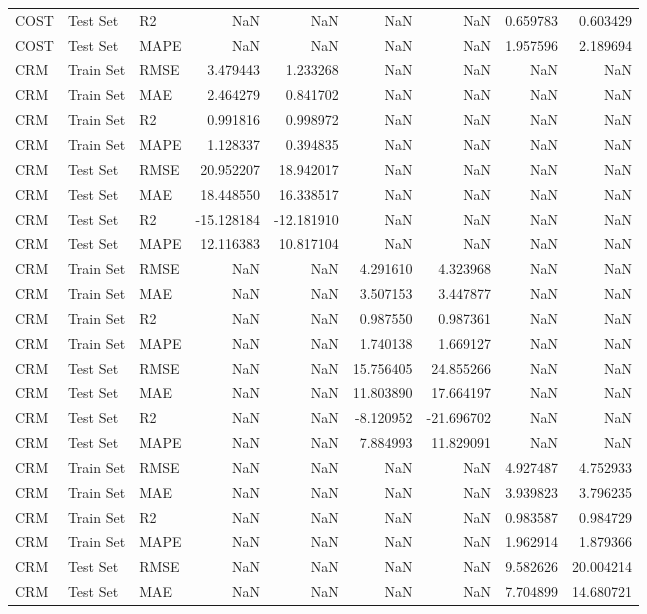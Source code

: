 \begin{tabular}{lllrrrrrr}
COST & Test Set & R2 & NaN & NaN & NaN & NaN & 0.659783 & 0.603429 \\
COST & Test Set & MAPE & NaN & NaN & NaN & NaN & 1.957596 & 2.189694 \\
CRM & Train Set & RMSE & 3.479443 & 1.233268 & NaN & NaN & NaN & NaN \\
CRM & Train Set & MAE & 2.464279 & 0.841702 & NaN & NaN & NaN & NaN \\
CRM & Train Set & R2 & 0.991816 & 0.998972 & NaN & NaN & NaN & NaN \\
CRM & Train Set & MAPE & 1.128337 & 0.394835 & NaN & NaN & NaN & NaN \\
CRM & Test Set & RMSE & 20.952207 & 18.942017 & NaN & NaN & NaN & NaN \\
CRM & Test Set & MAE & 18.448550 & 16.338517 & NaN & NaN & NaN & NaN \\
CRM & Test Set & R2 & -15.128184 & -12.181910 & NaN & NaN & NaN & NaN \\
CRM & Test Set & MAPE & 12.116383 & 10.817104 & NaN & NaN & NaN & NaN \\
CRM & Train Set & RMSE & NaN & NaN & 4.291610 & 4.323968 & NaN & NaN \\
CRM & Train Set & MAE & NaN & NaN & 3.507153 & 3.447877 & NaN & NaN \\
CRM & Train Set & R2 & NaN & NaN & 0.987550 & 0.987361 & NaN & NaN \\
CRM & Train Set & MAPE & NaN & NaN & 1.740138 & 1.669127 & NaN & NaN \\
CRM & Test Set & RMSE & NaN & NaN & 15.756405 & 24.855266 & NaN & NaN \\
CRM & Test Set & MAE & NaN & NaN & 11.803890 & 17.664197 & NaN & NaN \\
CRM & Test Set & R2 & NaN & NaN & -8.120952 & -21.696702 & NaN & NaN \\
CRM & Test Set & MAPE & NaN & NaN & 7.884993 & 11.829091 & NaN & NaN \\
CRM & Train Set & RMSE & NaN & NaN & NaN & NaN & 4.927487 & 4.752933 \\
CRM & Train Set & MAE & NaN & NaN & NaN & NaN & 3.939823 & 3.796235 \\
CRM & Train Set & R2 & NaN & NaN & NaN & NaN & 0.983587 & 0.984729 \\
CRM & Train Set & MAPE & NaN & NaN & NaN & NaN & 1.962914 & 1.879366 \\
CRM & Test Set & RMSE & NaN & NaN & NaN & NaN & 9.582626 & 20.004214 \\
CRM & Test Set & MAE & NaN & NaN & NaN & NaN & 7.704899 & 14.680721 \\

\end{tabular}
